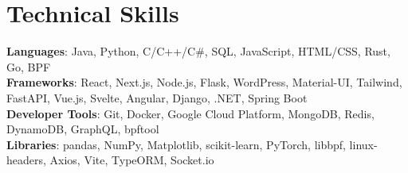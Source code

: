 \documentclass[letterpaper,11pt]{article}
\begin{document}
\section{Technical Skills}
 \begin{itemize}[leftmargin=0.15in, label={}]
    \small{\item{
     \textbf{Languages}{: Java, Python, C/C++/C\#, SQL, JavaScript, HTML/CSS, Rust, Go, BPF} \\
     \textbf{Frameworks}{: React, Next.js, Node.js, Flask, WordPress, Material-UI, Tailwind, FastAPI, Vue.js, Svelte, Angular, Django, .NET, Spring Boot} \\
     \textbf{Developer Tools}{: Git, Docker, Google Cloud Platform, MongoDB, Redis, DynamoDB, GraphQL, bpftool} \\
     \textbf{Libraries}{: pandas, NumPy, Matplotlib, scikit-learn, PyTorch, libbpf, linux-headers, Axios, Vite, TypeORM, Socket.io}
    }}
 \end{itemize}

\end{document}
